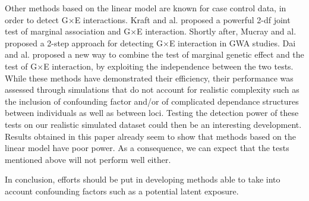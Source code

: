 \documentclass[10pt,a4paper]{article}
\begin{document}
Other methods based on the linear model are known for case control data, in order to detect G$\times$E interactions. Kraft and al. \citep{kraft2007exploiting} proposed a powerful 2-df joint test of marginal association and G$\times$E interaction. Shortly after, Mucray and al. \citep{murcray2009gene} proposed a 2-step approach for detecting G$\times$E interaction in GWA studies. 
Dai and al.\citep{dai2012simultaneously} proposed a new way to combine the test of marginal genetic effect and the test of G$\times$E interaction, by exploiting the independence between the two tests.
While these methods have demonstrated their efficiency, their performance was assessed through simulations that do not  account for realistic complexity such as the inclusion of confounding factor and/or of complicated dependance structures between individuals as well as between loci. 
Testing the detection power of these tests on our realistic simulated dataset could then be an interesting development. Results obtained in this paper already seem to show that methods based on the linear model have poor power. As a consequence, we can expect that the tests mentioned above will not perform well either. 

In conclusion, efforts should be put in developing methods able to take into account confounding factors such as a potential latent exposure.  




\newpage



\newpage
\end{document}
